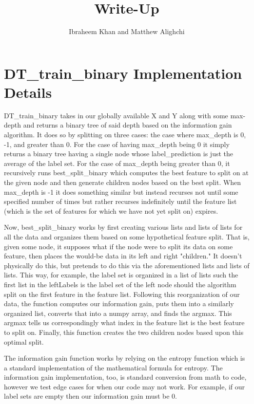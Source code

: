 \documentclass{article}
\begin{document}
    \title{Write-Up}
    \author{Ibraheem Khan and Matthew Alighchi}
    \maketitle
\section{DT\_train\_binary Implementation Details}
    \par DT\_train\_binary takes in our globally available X and Y along with some max-depth and returns a binary tree of said depth based on the information gain algorithm. It does so by splitting on three
cases: the case where max\_depth is 0, -1, and greater than 0. For the case of having max\_depth being 0 it simply returns a binary tree having a single node whose label\_prediction is just the average
of the label set. For the case of max\_depth being greater than 0, it recursively runs best\_split\_binary which computes the best feature to split on at the given node and then generate children nodes based
on the best split. When max\_depth is -1 it does something similar but instead recurses not until some specified number of times but rather recurses indefinitely until the feature list (which is the set
of features for which we have not yet split on) expires.
    \par Now, best\_split\_binary works by first creating various lists and lists of lists for all the data and organizes them based on some hypothetical feature split. That is, given some node, it supposes
what if the node were to split its data on some feature, then places the would-be data in its left and right "children." It doesn't physically do this, but pretends to do this via the aforementioned lists and
lists of lists. This way, for example, the label set is organized in a list of lists such the first list in the leftLabels is the label set of the left node should the algorithm split on the first feature in
the feature list. Following this reorganization of our data, the function computes our information gain, puts them into a similarly organized list, converts that into a numpy array, and finds the argmax. This
argmax tells us correspondingly what index in the feature list is the best feature to split on. Finally, this function creates the two children nodes based upon this optimal split.
    \par The information gain function works by relying on the entropy function which is a standard implementation of the mathematical formula for entropy. The information gain implementation, too, is standard
conversion from math to code, however we test edge cases for when our code may not work. For example, if our label sets are empty then our information gain must be 0.
\end{document}
